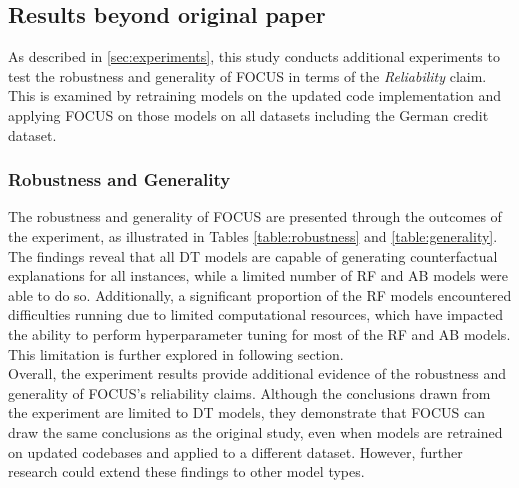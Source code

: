 \subsection{Results beyond original paper}
\label{sec: results beyond original paper}


As described in \ref{sec:experiments}, this study conducts additional experiments to test the robustness and generality of FOCUS in terms of the \textit{Reliability} claim. This is examined by retraining models on the updated code implementation and applying FOCUS on those models on all datasets including the German credit dataset.

\subsubsection{Robustness and Generality}
The robustness and generality of FOCUS are presented through the outcomes of the experiment, as illustrated in Tables \ref{table:robustness} and \ref{table:generality}. The findings reveal that all DT models are capable of generating counterfactual explanations for all instances, while a limited number of RF and AB models were able to do so. Additionally, a significant proportion of the RF models encountered difficulties running due to limited computational resources, which have impacted the ability to perform hyperparameter tuning for most of the RF and AB models. This limitation is further explored in following section.\\
Overall, the experiment results provide additional evidence of the robustness and generality of FOCUS's reliability claims. Although the conclusions drawn from the experiment are limited to DT models, they demonstrate that FOCUS can draw the same conclusions as the original study, even when models are retrained on updated codebases and applied to a different dataset. However, further research could extend these findings to other model types.

